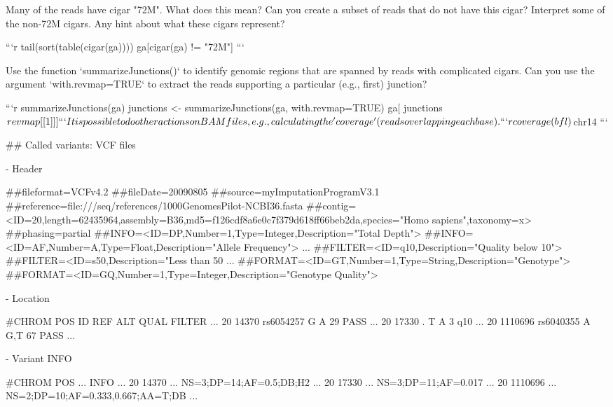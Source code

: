 Many of the reads have cigar "72M". What does this mean? Can you
create a subset of reads that do not have this cigar? Interpret some
of the non-72M cigars. Any hint about what these cigars represent?

```{r}
tail(sort(table(cigar(ga))))
ga[cigar(ga) != "72M"]
```

Use the function `summarizeJunctions()` to identify genomic regions
that are spanned by reads with complicated cigars. Can you use the
argument `with.revmap=TRUE` to extract the reads supporting a
particular (e.g., first) junction?

```{r}
summarizeJunctions(ga)
junctions <- summarizeJunctions(ga, with.revmap=TRUE)
ga[ junctions$revmap[[1]] ]
```

It is possible to do other actions on BAM files, e.g., calculating the
'coverage' (reads overlapping each base).

```{r}
coverage(bfl)$chr14
```
    
## Called variants: VCF files

- Header

          ##fileformat=VCFv4.2
          ##fileDate=20090805
          ##source=myImputationProgramV3.1
          ##reference=file:///seq/references/1000GenomesPilot-NCBI36.fasta
          ##contig=<ID=20,length=62435964,assembly=B36,md5=f126cdf8a6e0c7f379d618ff66beb2da,species="Homo sapiens",taxonomy=x>
          ##phasing=partial
          ##INFO=<ID=DP,Number=1,Type=Integer,Description="Total Depth">
          ##INFO=<ID=AF,Number=A,Type=Float,Description="Allele Frequency">
          ...
          ##FILTER=<ID=q10,Description="Quality below 10">
          ##FILTER=<ID=s50,Description="Less than 50%
          ...
          ##FORMAT=<ID=GT,Number=1,Type=String,Description="Genotype">
          ##FORMAT=<ID=GQ,Number=1,Type=Integer,Description="Genotype Quality">

- Location

          #CHROM POS     ID        REF    ALT     QUAL FILTER ...
          20     14370   rs6054257 G      A       29   PASS   ...
          20     17330   .         T      A       3    q10    ...
          20     1110696 rs6040355 A      G,T     67   PASS   ...

- Variant INFO

          #CHROM POS     ...	INFO                              ...
          20     14370   ...	NS=3;DP=14;AF=0.5;DB;H2           ...
          20     17330   ...	NS=3;DP=11;AF=0.017               ...
          20     1110696 ...	NS=2;DP=10;AF=0.333,0.667;AA=T;DB ...

